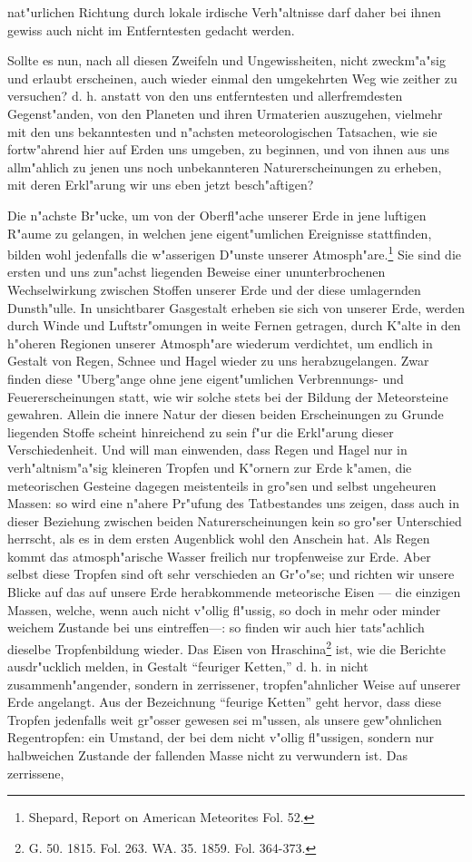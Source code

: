 \documentclass[a4paper, 8pt, oneside, polutonikogreek, german]{article}
\begin{document}
nat"urlichen Richtung durch lokale irdische Verh"altnisse darf daher bei ihnen gewiss auch nicht im Entferntesten gedacht werden.

Sollte es nun, nach all diesen Zweifeln und Ungewissheiten, nicht zweckm"a"sig und erlaubt erscheinen, auch wieder einmal den umgekehrten Weg wie zeither zu versuchen? d. h. anstatt von den uns entferntesten und allerfremdesten Gegenst"anden, von den Planeten und ihren Urmaterien auszugehen, vielmehr mit den uns bekanntesten und n"achsten meteorologischen Tatsachen, wie sie fortw"ahrend hier auf Erden uns umgeben, zu beginnen, und von ihnen aus uns allm"ahlich zu jenen uns noch unbekannteren Naturerscheinungen zu erheben, mit deren Erkl"arung wir uns eben jetzt besch"aftigen?

Die n"achste Br"ucke, um von der Oberfl"ache unserer Erde in jene luftigen R"aume zu gelangen, in welchen jene eigent"umlichen Ereignisse stattfinden, bilden wohl jedenfalls die w"asserigen D"unste unserer Atmosph"are.\footnote{Shepard, Report on American Meteorites Fol. 52.} Sie sind die ersten und uns zun"achst liegenden Beweise einer ununterbrochenen Wechselwirkung zwischen Stoffen unserer Erde und der diese umlagernden Dunsth"ulle. In unsichtbarer Gasgestalt erheben sie sich von unserer Erde, werden durch Winde und Luftstr"omungen in weite Fernen getragen, durch K"alte in den h"oheren Regionen unserer Atmosph"are wiederum verdichtet, um endlich in Gestalt von Regen, Schnee und Hagel wieder zu uns herabzugelangen. Zwar finden diese "Uberg"ange ohne jene eigent"umlichen Verbrennungs- und Feuererscheinungen statt, wie wir solche stets bei der Bildung der Meteorsteine gewahren. Allein die innere Natur der diesen beiden Erscheinungen zu Grunde liegenden Stoffe scheint hinreichend zu sein f"ur die Erkl"arung dieser Verschiedenheit. Und will man einwenden, dass Regen und Hagel nur in verh"altnism"a"sig kleineren Tropfen und K"ornern zur Erde k"amen, die meteorischen Gesteine dagegen meistenteils in gro"sen und selbst ungeheuren Massen: so wird eine n"ahere Pr"ufung des Tatbestandes uns zeigen, dass auch in dieser Beziehung zwischen beiden Naturerscheinungen kein so gro"ser Unterschied herrscht, als es in dem ersten Augenblick wohl den Anschein hat. Als Regen kommt das atmosph"arische Wasser freilich nur tropfenweise zur Erde. Aber selbst diese Tropfen sind oft sehr verschieden an Gr"o"se; und richten wir unsere Blicke auf das auf unsere Erde herabkommende meteorische Eisen --- die einzigen Massen, welche, wenn auch nicht v"ollig fl"ussig, so doch in mehr oder minder weichem Zustande bei uns eintreffen---: so finden wir auch hier tats"achlich dieselbe Tropfenbildung wieder. Das Eisen von Hraschina\footnote{G. 50. 1815. Fol. 263. WA. 35. 1859. Fol. 364-373.} ist, wie die Berichte ausdr"ucklich melden, in Gestalt "`feuriger Ketten,"' d. h. in nicht zusammenh"angender, sondern in zerrissener, tropfen"ahnlicher Weise auf unserer Erde angelangt. Aus der Bezeichnung "`feurige Ketten"' geht hervor, dass diese Tropfen jedenfalls weit gr"osser gewesen sei m"ussen, als unsere gew"ohnlichen Regentropfen: ein Umstand, der bei dem nicht v"ollig fl"ussigen, sondern nur halbweichen Zustande der fallenden Masse nicht zu verwundern ist. Das zerrissene, 
\end{document}
